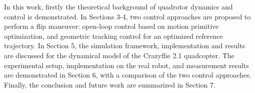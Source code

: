 

In this work, firstly the theoretical background of quadrotor dynamics and control is demonstrated. In Sections 3-4, two control approaches are proposed to perform a flip maneuver:  open-loop control based on motion primitive optimization, and geometric tracking control for an optimized reference trajectory. In Section 5, the simulation framework, implementation and results are discussed for the dynamical model of the Crazyflie 2.1 quadcopter. The experimental setup, implementation on the real robot, and  measurement results are demonstrated in Section 6, with a comparison of the two control approaches. Finally, the conclusion and future work are summarized in Section 7.
